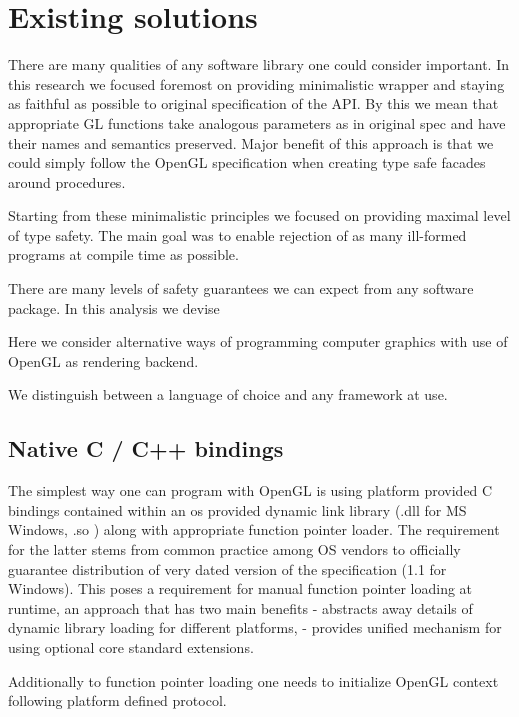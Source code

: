 \chapter{Existing solutions}


There are many qualities of any software library one could consider important.
In this research we focused foremost on providing minimalistic wrapper and staying as faithful as possible to original specification of the API.
By this we mean that appropriate GL functions take analogous parameters as in original spec and have their names and semantics preserved.
Major benefit of this approach is that we could simply follow the OpenGL specification when creating type safe facades around procedures.

Starting from these minimalistic principles we focused on providing maximal level of type safety. The main goal was to enable rejection of as many ill-formed programs at compile time as possible.

There are many levels of safety guarantees we can expect from any software package.
In this analysis we devise 

Here we consider alternative ways of programming computer graphics with use of OpenGL as rendering backend.

We distinguish between a language of choice and any framework at use. 

\section{Native C / C++ bindings}

The simplest way one can program with OpenGL is using platform provided C bindings contained within an os provided dynamic link library (.dll for MS Windows, .so ) along with appropriate function pointer loader.
The requirement for the latter stems from common practice among OS vendors to officially guarantee distribution of very dated version of the specification (1.1 for Windows).
This poses a requirement for manual function pointer loading at runtime, an approach that has two main benefits
- abstracts away details of dynamic library loading for different platforms, 
- provides unified mechanism for using optional core standard extensions.

Additionally to function pointer loading one needs to initialize OpenGL context following platform defined protocol.

